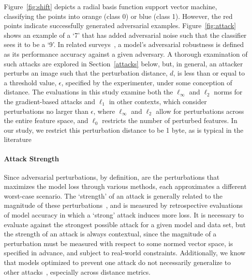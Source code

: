 \documentclass[lettersize,journal]{IEEEtran}
\begin{document}
Figure~\ref{fig:shift} depicts a radial basis function support vector machine, classifying the points into orange (class 0) or blue (class 1). However, the red points indicate successfully generated adversarial examples. Figure~\ref{fig:attack} shows an example of a `7' that has added adversarial noise such that the classifier sees it to be a `9'.
In related surveys~\cite{dohmatob_generalized_2019, biggio_evasion_2013-1, bect_bayesian_2017, chakraborty_adversarial_2018, carlini_towards_2017, croce_reliable_2020}, a model's adversarial robustness is defined as its performance accuracy against a given adversary. A thorough examination of such attacks are explored in Section~\ref{attacks} below, but, in general, an attacker perturbs an image such that the perturbation distance, $d$, is less than or equal to a threshold value, $\epsilon$, specified by the experimenter, under some conception of distance. The evaluations in this study examine both the $\ell_{\infty}$ and $\ell_2$ norms for the gradient-based attacks and $\ell_1$ in other contexts, which consider perturbations no larger than $\epsilon$, where $\ell_{\infty}$ and $\ell_2$ allow for perturbations across the entire feature space, and $\ell_0$ restricts the number of perturbed features. In our study, we restrict this perturbation distance to be 1 byte, as is typical in the literature \cite{madry2017towards, miller_adversarial_2020, biggio_evasion_2013, biggio_multiple_2009}

\paragraph{Attack Strength}
 Since adversarial perturbations, by definition, are the perturbations that maximizes the model loss through various methods, each approximates a different worst-case scenario. The `strength' of an attack is generally related to the magnitude of these perturbations~\cite{carlini_towards_2017}, and is measured by retrospective evaluations of model accuracy in which a `strong' attack induces more loss. It is necessary to evaluate against the strongest possible attack for a given model and data set, but the strength of an attack is always contextual, since the magnitude of a perturbation must be measured with respect to some normed vector space, is specified in advance, and subject to real-world constraints. Additionally, we know that models optimized to prevent one attack do not necessarily generalize to other attacks~\cite{carlini_towards_2017}, especially across distance metrics.
\end{document}
